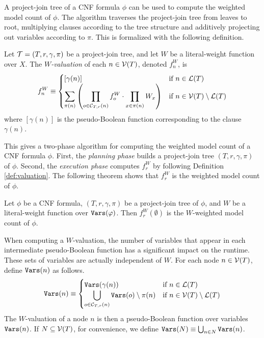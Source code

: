 A project-join tree of a CNF formula $\phi$ can be used to compute the weighted model count of $\phi$. 
The algorithm traverses the project-join tree from leaves to root, multiplying clauses according to the tree structure and additively projecting out variables according to $\pi$. 
This is formalized with the following definition.
\begin{definition}\label{def:valuation}
    Let $\mathcal{T} = (T, r, \gamma, \pi)$ be a project-join tree, and let $W$ be a literal-weight function over $X$. The \emph{$W$-valuation} of each $n \in \mathcal{V}(T)$, denoted $f^W_n$, is
    \begin{align*}
        f^W_n \equiv
        \begin{cases}
            [\gamma(n)] & \text{if } n \in \mathcal{L}(T) \\
            \displaystyle
            {\sum_{\pi(n)} \left(  \prod_{o \in \mathcal{C}_{T,r}(n)} f^W_o \cdot \prod_{x \in \pi(n)} W_x  \right)} & \text{if } n \in \mathcal{V}(T) \setminus \mathcal{L}(T)
        \end{cases}
    \end{align*}
    where $[\gamma(n)]$ is the pseudo-Boolean function corresponding to the clause $\gamma(n)$.
\end{definition}

This gives a two-phase algorithm for computing the weighted model count of a CNF formula $\phi$. First, the \emph{planning phase} builds a project-join tree $(T, r, \gamma, \pi)$ of $\phi$. Second, the \emph{execution phase} computes $f^W_r$ by following Definition \ref{def:valuation}. The following theorem shows that $f^W_r$ is the weighted model count of $\phi$.
\begin{theorem}
\label{thm_valuation_wmc_procount}
    Let $\phi$ be a CNF formula, $(T, r, \gamma, \pi)$ be a project-join tree of $\phi$, and $W$ be a literal-weight function over $\texttt{\upshape Vars}(\varphi)$. Then $f^W_r(\emptyset)$ is the $W$-weighted model count of $\phi$.
\end{theorem}

When computing a $W$-valuation, the number of variables that appear in each intermediate pseudo-Boolean function has a significant impact on the runtime. These sets of variables are actually independent of $W$. For each node $n \in \mathcal{V}(T)$, define $\texttt{\upshape Vars}(n)$ as follows.
\begin{align*}
    \texttt{\upshape Vars}(n) \equiv
    \begin{cases}
        \texttt{\upshape Vars}(\gamma(n)) & \text{if } n \in \mathcal{L}(T) \\
        \displaystyle
        \bigcup_{o \in \mathcal{C}_{T,r}(n)} \texttt{\upshape Vars}(o) \setminus \pi(n) & \text{if } n \in \mathcal{V}(T) \setminus \mathcal{L}(T)
    \end{cases}
\end{align*}
The $W$-valuation of a node $n$ is then a pseudo-Boolean function over variables $\texttt{\upshape Vars}(n)$. 
If $N \subseteq \mathcal{V}(T)$, for convenience, we define $\texttt{\upshape Vars}(N) \equiv \bigcup_{n \in N} \texttt{\upshape Vars}(n)$.

